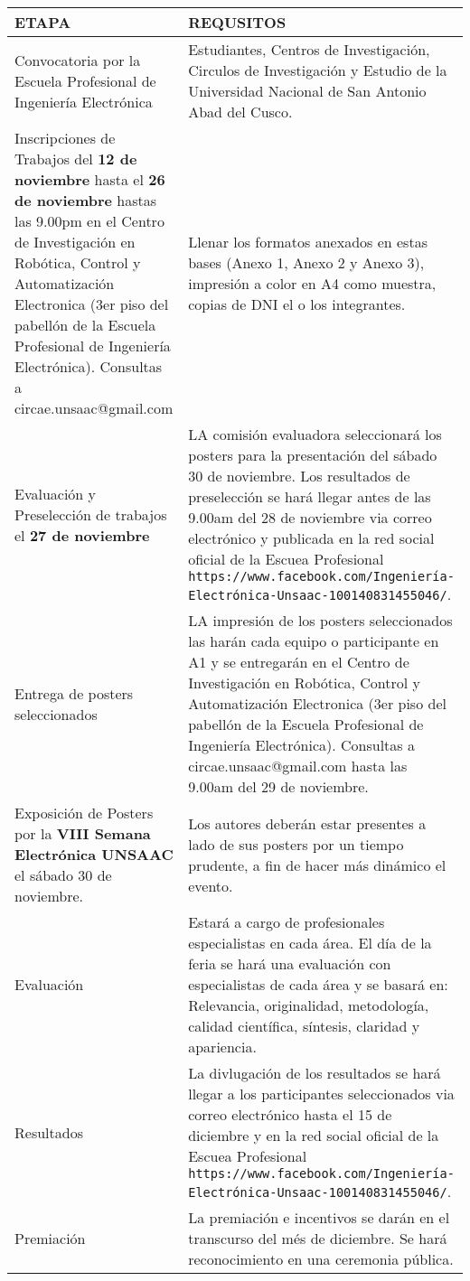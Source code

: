 \documentclass{article}
\begin{document}
\begin{tabular}{|p{8cm}|p{8cm}|}
\hline
\textbf{ETAPA} &  \textbf{REQUSITOS} \\ \hline
Convocatoria por la Escuela Profesional de Ingeniería Electrónica & Estudiantes, Centros de Investigación, Circulos de Investigación y Estudio de la Universidad Nacional de San Antonio Abad del Cusco. \\ \hline
Inscripciones de Trabajos del \textbf{12 de noviembre} hasta el \textbf{26 de noviembre} hastas las 9.00pm en el Centro de Investigación en Robótica, Control y Automatización Electronica (3er piso del pabellón de la Escuela Profesional de Ingeniería Electrónica). Consultas a circae.unsaac@gmail.com & Llenar los formatos anexados en estas bases (Anexo 1, Anexo 2 y Anexo 3), impresión a color en A4 como muestra, copias de DNI el o los integrantes. \\ \hline
Evaluación y Preselección de trabajos el \textbf{27 de noviembre} & LA comisión evaluadora seleccionará los posters para la presentación del sábado 30 de noviembre. Los resultados de preselección se hará llegar antes de las 9.00am del 28 de noviembre via correo electrónico y publicada en la red social oficial de la Escuea Profesional \texttt{https://www.facebook.com/Ingeniería-Electrónica-Unsaac-100140831455046/}. \\ \hline
Entrega de posters seleccionados & LA impresión de los posters seleccionados las harán cada equipo o participante en A1  y se entregarán en el Centro de Investigación en Robótica, Control y Automatización Electronica (3er piso del pabellón de la Escuela Profesional de Ingeniería Electrónica). Consultas a circae.unsaac@gmail.com hasta las 9.00am del 29 de noviembre. \\ \hline
Exposición de Posters por la \textbf{VIII Semana Electrónica UNSAAC} el sábado 30 de noviembre. & Los autores deberán estar presentes a lado de sus posters por un tiempo prudente, a fin de hacer más dinámico el evento. \\ \hline
Evaluación & Estará a cargo de profesionales especialistas en cada área. El día de la feria se hará una evaluación con especialistas de cada área y se basará en: Relevancia, originalidad, metodología, calidad científica, síntesis, claridad y apariencia.\\ \hline
Resultados & La divlugación de los resultados se hará llegar a los participantes seleccionados via correo electrónico hasta el 15 de diciembre y en la red social oficial de la Escuea Profesional \texttt{https://www.facebook.com/Ingeniería-Electrónica-Unsaac-100140831455046/}. \\ \hline
Premiación & La premiación e incentivos se darán en el transcurso del més de diciembre. Se hará reconocimiento en una ceremonia pública. \\ \hline
\end{tabular}
\end{document}
